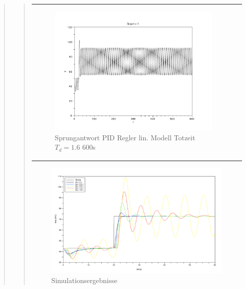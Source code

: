 \begin{quote}
\begin{quote}
\begin{center}
\begin{tabular}{ll}
                    \begin{minipage}{0.6\textwidth}
                        \begin{figure}[H]
                            \includegraphics[scale=0.4,trim = 0cm 0cm 0cm
                            0cm, clip]
                            {./Bilder/4_1_Td_16_600s}
                              \caption{Sprungantwort PID Regler lin. Modell Totzeit $T_d = 1.6$ 600s}
                        \end{figure}
                    \end{minipage}
                
                \end{tabular}
            \end{center}
        
        \vspace{1em}
    \begin{figure}[H]
    \centering
        \includegraphics[scale=0.4, trim = 0cm 0cm 0cm 0cm, clip]{./Bilder/4_1_Simulation}
            \caption{Simulationsergebnisse}
    \end{figure}
  

\end{quote}
\end{quote}
